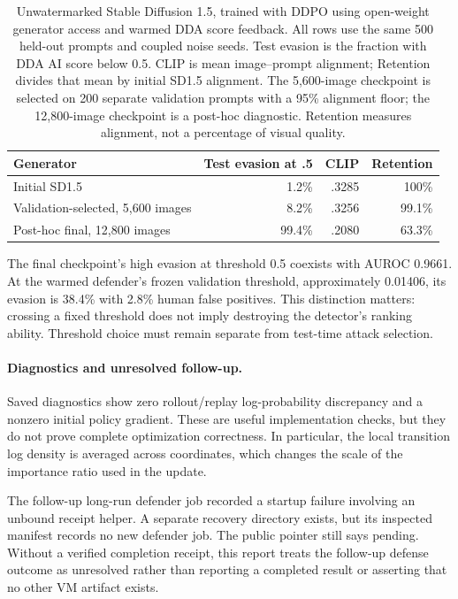 \begin{table}[ht]\centering\small
\begin{tabular}{lrrr}\toprule
Generator & Test evasion at .5 & CLIP & Retention\\\midrule
Initial SD1.5 & 1.2\% & .3285 & 100\%\\
Validation-selected, 5,600 images & 8.2\% & .3256 & 99.1\%\\
Post-hoc final, 12,800 images & 99.4\% & .2080 & 63.3\%\\\bottomrule
\end{tabular}
\caption{Unwatermarked Stable Diffusion 1.5, trained with DDPO using open-weight generator access and warmed DDA score feedback. All rows use the same 500 held-out prompts and coupled noise seeds. Test evasion is the fraction with DDA AI score below 0.5. CLIP is mean image--prompt alignment; Retention divides that mean by initial SD1.5 alignment. The 5,600-image checkpoint is selected on 200 separate validation prompts with a 95\% alignment floor; the 12,800-image checkpoint is a post-hoc diagnostic. Retention measures alignment, not a percentage of visual quality.}
\end{table}

The final checkpoint's high evasion at threshold 0.5 coexists with AUROC 0.9661. At the warmed defender's frozen validation threshold, approximately 0.01406, its evasion is 38.4\% with 2.8\% human false positives. This distinction matters: crossing a fixed threshold does not imply destroying the detector's ranking ability. Threshold choice must remain separate from test-time attack selection.

\paragraph{Diagnostics and unresolved follow-up.} Saved diagnostics show zero rollout/replay log-probability discrepancy and a nonzero initial policy gradient. These are useful implementation checks, but they do not prove complete optimization correctness. In particular, the local transition log density is averaged across coordinates, which changes the scale of the importance ratio used in the update.

The follow-up long-run defender job recorded a startup failure involving an unbound receipt helper. A separate recovery directory exists, but its inspected manifest records no new defender job. The public pointer still says pending. Without a verified completion receipt, this report treats the follow-up defense outcome as unresolved rather than reporting a completed result or asserting that no other VM artifact exists.

